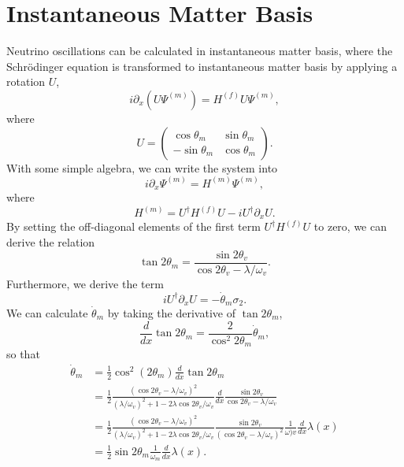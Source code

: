 \section{Instantaneous Matter Basis}


Neutrino oscillations can be calculated in instantaneous matter basis, where the Schr\"{o}dinger equation is transformed to instantaneous matter basis by applying a rotation $U$,
\begin{equation}
    i \partial_x \left(  U\Psi^{(m)} \right)= H^{(f)} U\Psi^{(m)},
\end{equation}
where
\begin{equation}
    U = \begin{pmatrix} \cos \theta_m & \sin \theta_m \\ -\sin\theta_m & \cos \theta_m \end{pmatrix}.
\end{equation}
With some simple algebra, we can write the system into
\begin{equation}
    i \partial _x \Psi^{(m)} = H^{(m)}\Psi^{(m)} ,
\end{equation}
where
\begin{equation}
    H^{(m)} = U^\dagger H^{(f)} U - i U^\dagger \partial_x U.
\end{equation}
By setting the off-diagonal elements of the first term $U^\dagger H^{(f)} U$ to zero, we can derive the relation
\begin{equation}
   \tan 2\theta_m = \frac{\sin 2\theta_v}{\cos 2\theta_v - \lambda/\omega_v}. 
\end{equation}
Furthermore, we derive the term
\begin{equation}
    i U^\dagger \partial_x U = - \dot\theta_m \sigma_2.
\end{equation}
We can calculate $\dot\theta_m$ by taking the derivative of $\tan 2\theta_m$,
\begin{equation}
    \frac{d}{dx} \tan 2\theta_m = \frac{2}{\cos^2 2\theta_m} \dot\theta_m,
\end{equation}
so that
\begin{align}
    \dot\theta_m &= \frac{1}{2} \cos^2 (2\theta_m) \frac{d}{dx} \tan 2\theta_m \\
   & = \frac{1}{2} \frac{(\cos 2\theta_v - \lambda/\omega_v)^2}{ (\lambda/\omega_v)^2 + 1 - 2\lambda \cos 2\theta_v /\omega_v } \frac{d}{dx} \frac{\sin 2\theta_v}{\cos 2\theta_v - \lambda/\omega_v} \\
   & = \frac{1}{2} \frac{(\cos 2\theta_v - \lambda/\omega_v)^2}{ (\lambda/\omega_v)^2 + 1 - 2\lambda \cos 2\theta_v /\omega_v }  \frac{\sin 2\theta_v}{(\cos 2\theta_v - \lambda/\omega_v)^2} \frac{1}{\omega)v} \frac{d}{dx} \lambda(x) \\
   & = \frac{1}{2} \sin 2\theta_m \frac{1}{\omega_m} \frac{d}{dx} \lambda(x).
\end{align}
   


